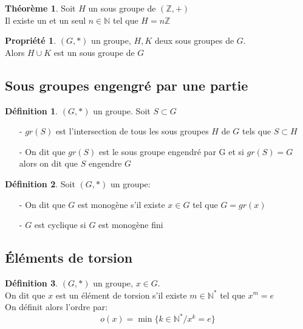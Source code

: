 \documentclass[fleqn]{article}
\theoremstyle{definition} \newtheorem*{defi}{D\'efinition}
\theoremstyle{definition} \newtheorem*{theo}{Th\'eor\`eme}
\theoremstyle{definition} \newtheorem*{coro}{Corollaire}
\theoremstyle{remark} \newtheorem*{rqs}{Remarques}
\theoremstyle{definition} \newtheorem*{prop}{Propri\'et\'e}
\begin{document}
\begin{theo}
Soit $H$ un sous groupe de $(\mathbb{Z}, +)$ \\
Il existe un et un seul $n \in \mathbb{N}$ tel que $H = n\mathbb{Z}$
\end{theo}

\begin{prop} $(G, *)$ un groupe, $H,K$ deux sous groupes de $G$.\\
Alors $H \cup K$ est un sous groupe de $G$
\end{prop}

\subsection{Sous groupes engengr\'e par une partie}
\begin{defi} $(G, *)$ un groupe. Soit $S \subset G$
	\begin{itemize}
		\item [-] $gr(S)$ est l'intersection de tous les sous groupes $H$ de $G$ tels que $S \subset H$
		\item [-] On dit que $gr(S)$ est le sous groupe engendr\'e par G et si $gr(S) = G$ alors on dit que $S$ engendre $G$
	\end{itemize}
\end{defi}


\begin{defi} Soit $(G, *)$ un groupe:
	\begin{itemize}
		\item [-] On dit que $G$ est monog\`ene s'il existe $x \in G$ tel que $G = gr(x)$
		\item [-] $G$ est cyclique si $G$ est monog\`ene fini
	\end{itemize}
\end{defi}

\subsection{\'El\'ements de torsion}
\begin{defi}
$(G,*)$ un groupe, $x \in G$. \\
On dit que $x$ est un \'el\'ement de torsion s'il existe $m \in \mathbb{N}^{*}$ tel que $x^m = e$ \\
On d\'efinit alors l'ordre par:
	\[o(x) = \min\{k \in \mathbb{N}^* / x^k = e\}\]
\end{defi}
\end{document}
